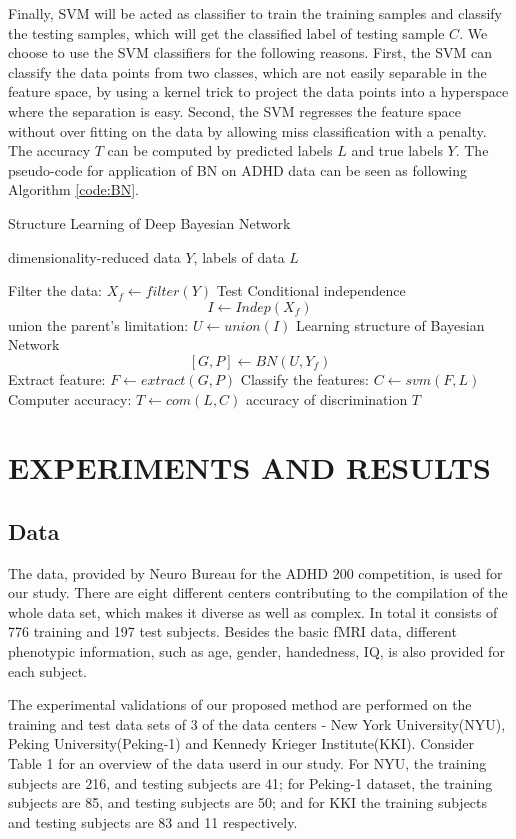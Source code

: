 \documentclass[10pt,twocolumn,letterpaper]{article}
\begin{document}
Finally, SVM will be acted as classifier to train the training samples and classify the testing samples, which will get the classified label of testing sample $C$. We choose to use the SVM classifiers for the following reasons. First, the SVM can classify the data points from two classes, which are not easily separable in the feature space, by using a kernel trick to project the data points into a hyperspace where the separation is easy. Second, the SVM regresses the feature space without over fitting on the data by allowing miss classification with a penalty. The accuracy $T$ can be computed by predicted labels $L$ and true labels $Y$. The pseudo-code for application of BN on ADHD data can be seen as following Algorithm \ref{code:BN}.  
\begin{algorithm}[h]
\caption{Structure Learning of Deep Bayesian Network}
\label{code:BN}
\begin{algorithmic}[1]
\Require
dimensionality-reduced data $Y$, labels of data $L$

\State Filter the data: $X_{f} \gets filter(Y)$ 
\State Test Conditional independence
\[
I \gets Indep(X_{f})
\] 
\State union the parent's limitation: $U \gets union(I)$
\State Learning structure of Bayesian Network
\[ [G,P] \gets BN(U,Y_f)
\]
\State Extract feature: $F \gets extract(G,P)$
\State Classify the features: $C \gets svm(F,L)$ 
\State Computer accuracy: $T \gets com(L,C)$ 
\Ensure
accuracy of discrimination $T$
\end{algorithmic}
\end{algorithm}



\section{EXPERIMENTS AND RESULTS}
\subsection{Data}
The data, provided by Neuro Bureau for the ADHD 200 competition, is used for our study. There are eight different centers contributing to the compilation of the whole data set, which makes it diverse as well as complex. In total it consists of 776 training and 197 test subjects. Besides the basic fMRI data, different phenotypic information, such as age, gender, handedness, IQ, is also provided for each subject.


The experimental validations of our proposed method are performed on the training and test data sets of 3 of the data centers - New York University(NYU), Peking University(Peking-1) and Kennedy Krieger Institute(KKI). Consider Table 1 for an overview of the data userd in our study. For NYU, the training subjects are 216, and testing subjects are 41; for Peking-1 dataset, the training subjects are 85, and testing subjects are 50; and for KKI the training subjects and testing subjects are 83 and 11 respectively.
\end{document}
